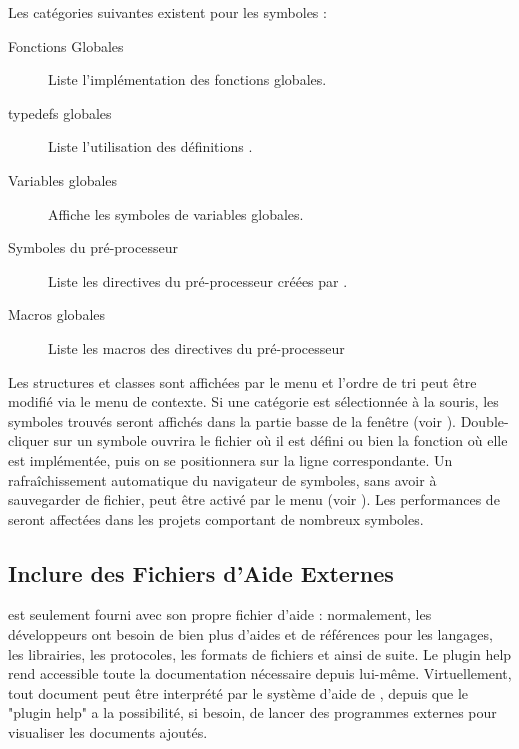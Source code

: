
Les catégories suivantes existent pour les symboles :

\begin{description}
\item[Fonctions Globales] Liste l'implémentation des fonctions globales.
\item[typedefs globales] Liste l'utilisation des définitions .
\item[Variables globales] Affiche les symboles de variables globales.
\item[Symboles du pré-processeur] Liste les directives du pré-processeur créées par .
\item[Macros globales] Liste les macros des directives du pré-processeur
\end{description}


Les structures et classes sont affichées par le menu  et l'ordre de tri peut être modifié via le menu de contexte. Si une catégorie est sélectionnée à la souris, les symboles trouvés seront affichés dans la partie basse de la fenêtre (voir ). Double-cliquer sur un symbole ouvrira le fichier où il est défini ou bien la fonction où elle est implémentée, puis on se positionnera sur la ligne correspondante. Un rafraîchissement automatique du navigateur de symboles, sans avoir à sauvegarder de fichier, peut être activé par le menu  (voir ). Les performances de \codeblocks seront affectées dans les projets comportant de nombreux symboles.



\subsection{Inclure des Fichiers d'Aide Externes}

\codeblocks est seulement fourni avec son propre fichier d'aide : normalement, les développeurs ont besoin de bien plus d'aides et de références pour les langages, les librairies, les protocoles, les formats de fichiers et ainsi de suite. Le plugin help rend accessible toute la documentation nécessaire depuis \codeblocks lui-même. Virtuellement, tout document peut être interprété par le système d'aide de \codeblocks, depuis que le "plugin help" a la possibilité, si besoin, de lancer des programmes externes pour visualiser les documents ajoutés.

